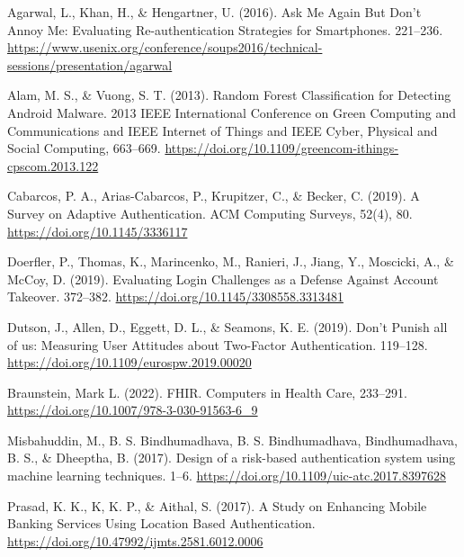 \begin{thebibliography}{99}
    
    Agarwal, L., Khan, H., \& Hengartner, U. (2016). Ask Me Again But Don’t Annoy Me: Evaluating Re-authentication Strategies for Smartphones. 221–236. \url{https://www.usenix.org/conference/soups2016/technical-sessions/presentation/agarwal}
    
    Alam, M. S., \& Vuong, S. T. (2013). Random Forest Classification for Detecting Android Malware. 2013 IEEE International Conference on Green Computing and Communications and IEEE Internet of Things and IEEE Cyber, Physical and Social Computing, 663–669. \url{https://doi.org/10.1109/greencom-ithings-cpscom.2013.122}
    
    Cabarcos, P. A., Arias-Cabarcos, P., Krupitzer, C., \& Becker, C. (2019). A Survey on Adaptive Authentication. ACM Computing Surveys, 52(4), 80. \url{https://doi.org/10.1145/3336117}
    
    Doerfler, P., Thomas, K., Marincenko, M., Ranieri, J., Jiang, Y., Moscicki, A., \& McCoy, D. (2019). Evaluating Login Challenges as a Defense Against Account Takeover. 372–382. \url{https://doi.org/10.1145/3308558.3313481}
    
    Dutson, J., Allen, D., Eggett, D. L., \& Seamons, K. E. (2019). Don’t Punish all of us: Measuring User Attitudes about Two-Factor Authentication. 119–128. \url{https://doi.org/10.1109/eurospw.2019.00020}
    
    Braunstein, Mark L. (2022). FHIR. Computers in Health Care, 233–291. \url{https://doi.org/10.1007/978-3-030-91563-6_9}
    
    Misbahuddin, M., B. S. Bindhumadhava, B. S. Bindhumadhava, Bindhumadhava, B. S., \& Dheeptha, B. (2017). Design of a risk-based authentication system using machine learning techniques. 1–6. \url{https://doi.org/10.1109/uic-atc.2017.8397628}
    
    Prasad, K. K., K, K. P., \& Aithal, S. (2017). A Study on Enhancing Mobile Banking Services Using Location Based Authentication. \url{https://doi.org/10.47992/ijmts.2581.6012.0006}
    

\end{thebibliography}
